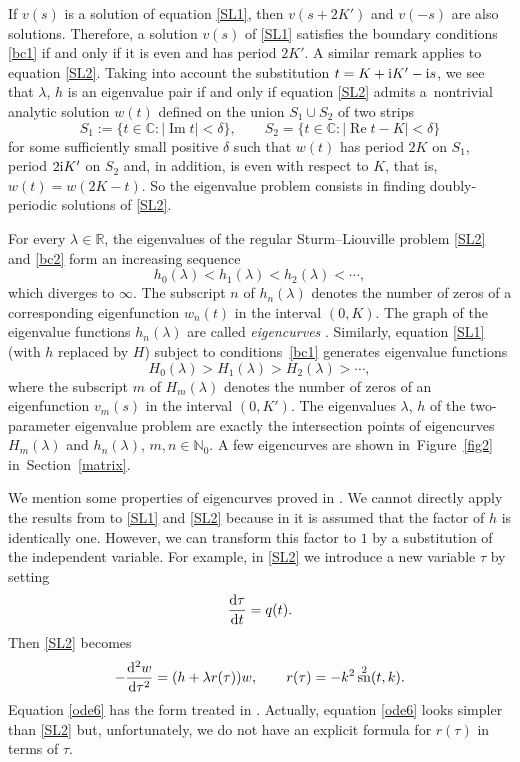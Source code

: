 \documentclass[10pt,a4paper]{amsart}
\newcommand{\R}{\mathbb{R}}
\newcommand{\C}{\mathbb{C}}
\newcommand{\N}{\mathbb{N}}
\DeclareMathOperator{\sn}{sn}
\numberwithin{equation}{section}
\begin{document}
If $v(s)$ is a solution of equation \eqref{SL1}, then $v(s+2K')$ and $v(-s)$ are also solutions.
Therefore, a solution $v(s)$ of \eqref{SL1} satisfies the boundary conditions \eqref{bc1} if and only if
it is even and has period $2K'$. A similar remark applies to equation \eqref{SL2}.
Taking into account the substitution $t=K+{\rm i}K'-{\rm i}s$, we see that $\lambda$, $h$ is an eigenvalue pair if and only if equation \eqref{SL2}
admits a~nontrivial analytic solution $w(t)$ defined on the union $S_1\cup S_2$ of two strips
\[ S_1:=\{t\in\C\colon |{\operatorname{Im}  t}|<\delta\},\qquad S_2=\{t\in\C\colon |{\operatorname{Re}  t-K}|<\delta\}\]
for some sufficiently small positive $\delta$ such that $w(t)$ has period $2K$ on $S_1$, period $2{\rm i}K'$ on $S_2$ and, in addition, is even with respect to $K$, that is, $w(t)=w(2K-t)$. So the eigenvalue problem consists in finding
doubly-periodic solutions of \eqref{SL2}.

For every $\lambda\in\R$, the eigenvalues of the regular Sturm--Liouville problem \eqref{SL2} and \eqref{bc2}
form an increasing sequence
\[ h_0(\lambda)<h_1(\lambda)<h_2(\lambda)<\cdots ,\]
which diverges to $\infty$.
The subscript $n$ of $h_n(\lambda)$ denotes the number of zeros of a corresponding eigenfunction $w_n(t)$ in the interval $(0,K)$.
The graph of the eigenvalue functions $h_n(\lambda)$ are called {\it eigencurves} \cite[Section~6]{AM}.
Similarly, equation \eqref{SL1} (with $h$ replaced by $H$) subject to conditions~\eqref{bc1}
generates eigenvalue functions
\[ H_0(\lambda)>H_1(\lambda)>H_2(\lambda)>\cdots,\]
where the subscript $m$ of $H_m(\lambda)$ denotes the number of zeros of an eigenfunction $v_m(s)$ in the interval $(0,K')$.
The eigenvalues $\lambda$, $h$ of the two-parameter eigenvalue problem are exactly the intersection points of
eigencurves $H_m(\lambda)$ and $h_n(\lambda)$, $m,n\in\N_0$.
A few eigencurves are shown in~Figure~\ref{fig2} in~Section~\ref{matrix}.

We mention some properties of eigencurves proved in \cite{BV}.
We cannot directly apply the results from \cite{BV} to \eqref{SL1} and \eqref{SL2}
because in \cite{BV} it is assumed that the factor of $h$ is identically one. However, we can transform
this factor to $1$ by a substitution of the independent variable. For example, in \eqref{SL2} we
introduce a new variable $\tau$ by setting
\[ \frac{{\rm d}\tau}{{\rm d}t}=q(t) .\]
Then \eqref{SL2} becomes
\begin{equation}\label{ode6}
 -\frac{{\rm d}^2w}{{\rm d}\tau^2}=(h+\lambda r(\tau)) w,\qquad r(\tau)=-k^2\sn^2(t,k).
 \end{equation}
Equation \eqref{ode6} has the form treated in \cite{BV}. Actually, equation \eqref{ode6} looks simpler than \eqref{SL2}
but, unfortunately, we do not have an explicit formula for $r(\tau)$ in terms of $\tau$.
\end{document}
